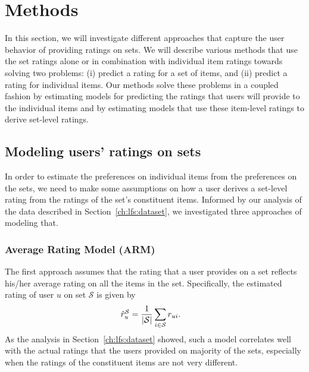 \section{Methods} \label{ch:lfs:lfs_method}
In this section, we will investigate different approaches that capture the user behavior of providing ratings on sets. We will describe various methods that use the set ratings alone or in combination with individual item ratings towards solving two problems: (i) predict a rating for a set of items, and (ii) predict a rating for individual items.  
Our methods solve these problems in a coupled fashion by estimating models for predicting the ratings that users will provide to the individual items and by estimating models that use these item-level ratings to derive set-level ratings.



\iffalse
In this section, we describe various methods that use the set ratings alone
or in combination with individual item ratings towards solving two
problems: (i) predict a rating for a set of items, and (ii)
predict a rating for individual items. 
Our methods solve these problems in a coupled fashion by estimating
models for predicting the ratings that users will provide to the individual
items and by estimating models that use these item-level ratings to derive
set-level ratings.
\fi


\subsection{Modeling users' ratings on sets}
In order to estimate the preferences on individual items from the preferences on the sets, we need to make some assumptions on how a user derives a set-level
rating from the ratings of the set's constituent items.
Informed by our analysis of the data described in Section~\ref{ch:lfs:dataset}, we
investigated three approaches of modeling that.



\subsubsection*{Average Rating Model (ARM)}
The first approach assumes that the rating that a user provides
on a set reflects his/her average rating on all the items in the
set. Specifically, the estimated rating of user $u$ on set $\mathcal{S}$ is given by
\begin{equation} \label{avgSetEq}
  \begin{split}
    \mbox{$\hat{r}_{u}^{\mathcal{S}}$} &= \frac{1}{|\mathcal{S}|} \sum_{i \in \mathcal{S}} r_{ui}.
  \end{split}
\end{equation}
\noindent As the analysis in Section~\ref{ch:lfs:dataset} showed, such a model correlates well
with the actual ratings that the users provided on majority of the sets,
especially when the ratings of the constituent items are not very different.


